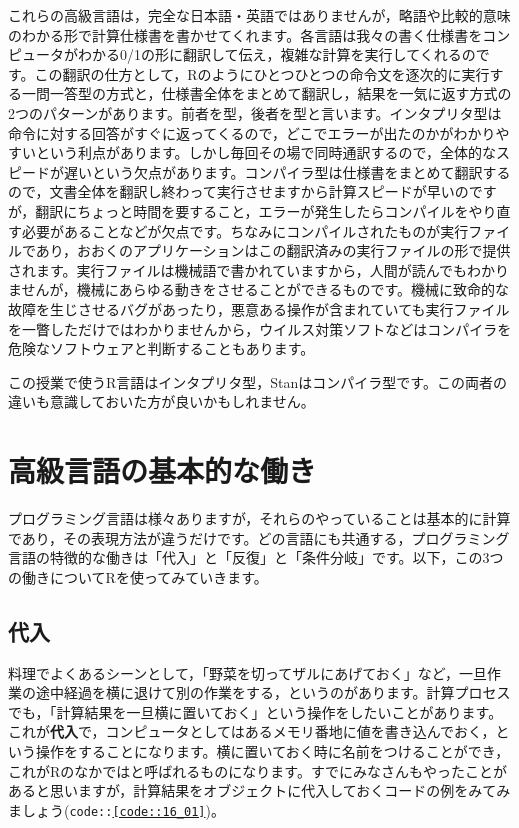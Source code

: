 \documentclass{ltjsbook}
\begin{document}
これらの高級言語は，完全な日本語・英語ではありませんが，略語や比較的意味のわかる形で計算仕様書を書かせてくれます。各言語は我々の書く仕様書をコンピュータがわかる0/1の形に翻訳して伝え，複雑な計算を実行してくれるのです。この翻訳の仕方として，Rのようにひとつひとつの命令文を逐次的に実行する一問一答型の方式と，仕様書全体をまとめて翻訳し，結果を一気に返す方式の2つのパターンがあります。前者を型，後者を型と言います。インタプリタ型は命令に対する回答がすぐに返ってくるので，どこでエラーが出たのかがわかりやすいという利点があります。しかし毎回その場で同時通訳するので，全体的なスピードが遅いという欠点があります。コンパイラ型は仕様書をまとめて翻訳するので，文書全体を翻訳し終わって実行させますから計算スピードが早いのですが，翻訳にちょっと時間を要すること，エラーが発生したらコンパイルをやり直す必要があることなどが欠点です。ちなみにコンパイルされたものが実行ファイルであり，おおくのアプリケーションはこの翻訳済みの実行ファイルの形で提供されます。実行ファイルは機械語で書かれていますから，人間が読んでもわかりませんが，機械にあらゆる動きをさせることができるものです。機械に致命的な故障を生じさせるバグがあったり，悪意ある操作が含まれていても実行ファイルを一瞥しただけではわかりませんから，ウイルス対策ソフトなどはコンパイラを危険なソフトウェアと判断することもあります。

この授業で使うR言語はインタプリタ型，Stanはコンパイラ型です。この両者の違いも意識しておいた方が良いかもしれません。

\section{高級言語の基本的な働き}
プログラミング言語は様々ありますが，それらのやっていることは基本的に計算であり，その表現方法が違うだけです。どの言語にも共通する，プログラミング言語の特徴的な働きは「代入」と「反復」と「条件分岐」です。以下，この3つの働きについてRを使ってみていきます。
\subsection{代入}
料理でよくあるシーンとして，「野菜を切ってザルにあげておく」など，一旦作業の途中経過を横に退けて別の作業をする，というのがあります。計算プロセスでも，「計算結果を一旦横に置いておく」という操作をしたいことがあります。これが\textbf{代入}で，コンピュータとしてはあるメモリ番地に値を書き込んでおく，という操作をすることになります。横に置いておく時に名前をつけることができ，これがRのなかではと呼ばれるものになります。すでにみなさんもやったことがあると思いますが，計算結果をオブジェクトに代入しておくコードの例をみてみましょう(\texttt{code::\ref{code::16_01}})。
\end{document}
